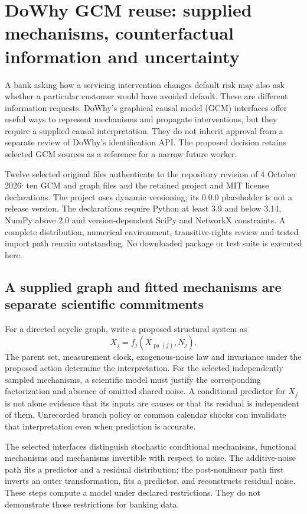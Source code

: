 \section{DoWhy GCM reuse: supplied mechanisms, counterfactual information and uncertainty}
\label{sec:exec24-gcm-reuse}

A bank asking how a servicing intervention changes default risk may also
ask whether a particular customer would have avoided default. These are
different information requests. DoWhy's graphical causal model (GCM)
interfaces offer useful ways to represent mechanisms and propagate
interventions, but they require a supplied causal interpretation. They do
not inherit approval from a separate review of DoWhy's identification API.
The proposed decision retains selected GCM sources as a reference for a
narrow future worker.\citep{exec24_gcm_source,exec24_gcm_choice}

Twelve selected original files authenticate to the repository revision of
4 October 2026: ten GCM and graph files and the retained project and MIT
license declarations. The project uses dynamic versioning; its 0.0.0
placeholder is not a release version. The declarations require Python
at least 3.9 and below 3.14, NumPy above 2.0 and version-dependent SciPy
and NetworkX constraints. A complete distribution, numerical environment,
transitive-rights review and tested import path remain outstanding.
No downloaded package or test suite is executed here.
\citep{exec24_gcm_source}

\subsection{A supplied graph and fitted mechanisms are separate scientific commitments}
For a directed acyclic graph, write a proposed structural system as
\[
 X_j=f_j(X_{\operatorname{pa}(j)},N_j).
\]
The parent set, measurement clock, exogenous-noise law and invariance
under the proposed action determine the interpretation. For the selected
independently sampled mechanisms, a scientific model must justify the
corresponding factorization and absence of omitted shared noise. A conditional
predictor for $X_j$ is not alone evidence that its inputs are causes or
that its residual is independent of them. Unrecorded branch policy or
common calendar shocks can invalidate that interpretation even when
prediction is accurate.\citep{exec24_gcm_choice}

The selected interfaces distinguish stochastic conditional mechanisms,
functional mechanisms and mechanisms invertible with respect to noise.
The additive-noise path fits a predictor and a residual distribution;
the post-nonlinear path first inverts an outer transformation, fits a
predictor, and reconstructs residual noise. These steps compute a model
under declared restrictions. They do not demonstrate those restrictions
for banking data.\citep{exec24_gcm_source}

